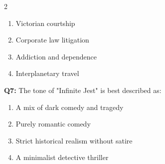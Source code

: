 \documentclass[10pt]{article}
\begin{document}
\begin{multicols}{2}
\begin{enumerate}[label=\arabic*.]
\item Victorian courtship
\item Corporate law litigation
\item Addiction and dependence
\item Interplanetary travel
\end{enumerate}
\textbf{Q7:} The tone of "Infinite Jest" is best described as:

\begin{enumerate}[label=\arabic*.]
\item A mix of dark comedy and tragedy
\item Purely romantic comedy
\item Strict historical realism without satire
\item A minimalist detective thriller
\end{enumerate}
\end{multicols}

\newpage
\end{document}
